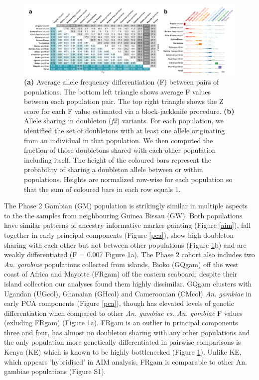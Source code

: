 \documentclass[a4paper,11pt,abstracton,hidelinks]{scrartcl}
\begin{document}
\begin{figure}[H]
	\begin{center}
		\includegraphics*[width=6.3in]{artwork/structure_composite.pdf}
	\end{center}
	\caption{\textbf{(a)} Average allele frequency differentiation (F) between pairs of populations. The bottom left triangle shows average F values between each population pair. The top right triangle shows the Z score for each F value estimated via a block-jackknife procedure. \textbf{(b)} Allele sharing in doubleton (\textit{f2}) variants. For each population, we identified the set of doubletons with at least one allele originating from an individual in that population. We then computed the fraction of those doubletons shared with each other population including itself. The height of the coloured bars represent the probability of sharing a doubleton allele between or within populations. Heights are normalized row-wise for each population so that the sum of coloured bars in each row equals 1.
}
	\label{fstdbl}
\end{figure}

%
The Phase 2 Gambian (GM) population is strikingly similar in multiple aspects to the the samples from neighbouring Guinea Bissau (GW).
%
Both populations have similar patterns of ancestry informative marker painting (Figure \ref{aim}), fall together in early principal components (Figure \ref{pca}), show high doubleton sharing with each other but not between other populations (Figure \ref{fstdbl}b) and are weakly differentiated (F = 0.007 Figure \ref{fstdbl}a).
%
The Phase 2 cohort also includes two \textit{An. gambiae} populations collected from islands, Bioko (GQgam) off the west coast of Africa and Mayotte (FRgam) off the eastern seaboard; despite their island collection our analyses found them highly dissimilar. 
%
GQgam clusters with Ugandan (UGcol), Ghanaian (GHcol) and Cameroonian (CMcol) \textit{An. gambiae} in early PCA components (Figure \ref{pca}), though has elevated levels of genetic differentiation when compared to other 
\textit{An. gambiae vs. An. gambiae} F values (exluding FRgam) (Figure \ref{fstdbl}a). 
%
FRgam is an outlier in principal components three and four, has almost no doubleton sharing with any other populations and the only population more genetically differentiated in pairwise comparisons is Kenya (KE) which is known to be highly bottlenecked \cite{Ag1000gConsortium2017} (Figure \ref{fstdbl}).
% 
Unlike KE, which appears 'hybridised' in AIM analysis, FRgam is comparable to other An. gambiae populations (Figure S1).
\end{document}
